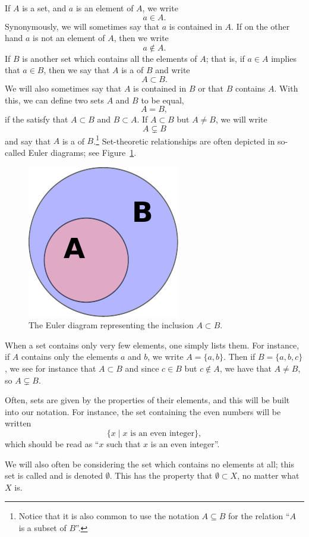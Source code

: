 If $A$ is a set, and $a$ is an element of $A$, we write
\[
  a \in A.
\]
Synonymously, we will sometimes say that $a$ is contained in $A$. If on the other hand $a$ is not an element of $A$, then we write
\[
  a \notin A.
\]
If $B$ is another set which contains all the elements of $A$; that is, if $a \in A$ implies that $a \in B$, then we say that $A$ is a  of $B$ and write
\[
  A \subset B.
\]
We will also sometimes say that $A$ is contained in $B$ or that $B$ contains $A$. With this, we can define two sets $A$ and $B$ to be equal,
\[
  A = B,
\]
if the satisfy that $A \subset B$ and $B \subset A$. If $A \subset B$ but $A \not= B$, we will write
\[
  A \subsetneq B
\]
and say that $A$ is a  of $B$.\footnote{Notice that it is also common to use the notation $A \subseteq B$ for the relation ``$A$ is a subset of $B$''.} Set-theoretic relationships are often depicted in so-called Euler diagrams; see Figure~\ref{eulersubset}.
\begin{figure}
  \centering
  \includegraphics{images/subset.pdf}
  \caption{The Euler diagram representing the inclusion $A \subset B$.}
  \label{eulersubset}
\end{figure}
\begin{example}
  When a set contains only very few elements, one simply lists them. For instance, if $A$ contains only the elements $a$ and $b$, we write $A = \{ a, b\}$. Then if $B = \{ a, b, c\}$, we see for instance that $A \subset B$ and since $c \in B$ but $c \notin A$, we have that $A \not= B$, so $A \subsetneq B$.
  
  Often, sets are given by the properties of their elements, and this will be built into our notation. For instance, the set containing the even numbers will be written
  \[
    \{ x \mid \text{$x$ is an even integer} \},
  \]
  which should be read as ``$x$ such that $x$ is an even integer''.
  
  We will also often be considering the set which contains no elements at all; this set is called  and is denoted $\emptyset$. This has the property that $\emptyset \subset X$, no matter what $X$ is.
\end{example}
